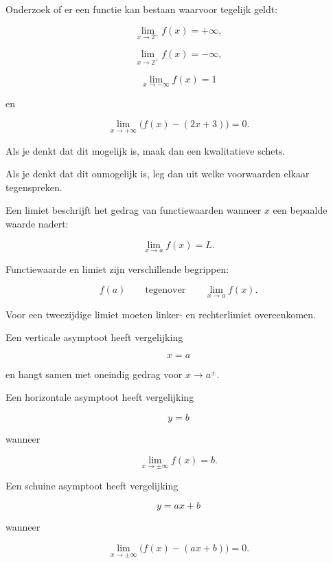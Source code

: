 \documentclass{ximera}
\begin{document}

\begin{oefening}{\oefG}

Onderzoek of er een functie kan bestaan waarvoor tegelijk geldt:

\[
\lim_{x\to2^-}f(x)=+\infty,
\]

\[
\lim_{x\to2^+}f(x)=-\infty,
\]

\[
\lim_{x\to-\infty}f(x)=1
\]

en

\[
\lim_{x\to+\infty}\bigl(f(x)-(2x+3)\bigr)=0.
\]

Als je denkt dat dit mogelijk is, maak dan een kwalitatieve schets.

Als je denkt dat dit onmogelijk is, leg dan uit welke voorwaarden
elkaar tegenspreken.

\end{oefening}




Een limiet beschrijft het gedrag van functiewaarden wanneer $x$ een
bepaalde waarde nadert:

\[
\boxed{
\lim_{x\to a}f(x)=L.
}
\]

Functiewaarde en limiet zijn verschillende begrippen:

\[
f(a)
\qquad\text{tegenover}\qquad
\lim_{x\to a}f(x).
\]

Voor een tweezijdige limiet moeten linker- en rechterlimiet
overeenkomen.

Een verticale asymptoot heeft vergelijking

\[
\boxed{x=a}
\]

en hangt samen met oneindig gedrag voor $x\to a^\pm$.

Een horizontale asymptoot heeft vergelijking

\[
\boxed{y=b}
\]

wanneer

\[
\lim_{x\to\pm\infty}f(x)=b.
\]

Een schuine asymptoot heeft vergelijking

\[
\boxed{y=ax+b}
\]

wanneer

\[
\lim_{x\to\pm\infty}
\bigl(f(x)-(ax+b)\bigr)=0.
\]
\end{document}
